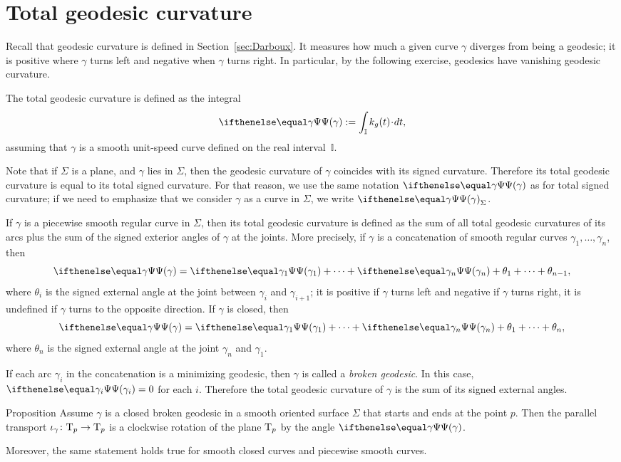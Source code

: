 \section{Total geodesic curvature}

Recall that geodesic curvature is defined in Section~\ref{sec:Darboux}.
It measures how much a given curve $\gamma$ diverges from being a geodesic;
it is positive where $\gamma$ turns left and negative when $\gamma$ turns right.
In particular, by the following exercise, geodesics have vanishing geodesic curvature.

The total geodesic curvature is defined as the integral 
\[\tgc\gamma
\df
\int_{\mathbb{I}} k_g(t)\cdot dt,\]
assuming that $\gamma$ is a smooth unit-speed curve defined on the real interval~$\mathbb{I}$.

Note that if $\Sigma$ is a plane, and $\gamma$ lies in $\Sigma$, then the geodesic curvature of $\gamma$ coincides
with its signed curvature. 
Therefore its total geodesic curvature is equal to its total signed curvature.
For that reason, we use the same notation $\tgc\gamma$ as for total signed curvature; if we need to emphasize that we consider $\gamma$ as a curve in $\Sigma$, we write $\tgc\gamma_\Sigma$.

If $\gamma$ is a piecewise smooth regular curve in $\Sigma$, then
its total geodesic curvature is defined as the sum of all total geodesic curvatures of its arcs plus the sum of the signed exterior angles of $\gamma$ at the joints.
More precisely, if $\gamma$ is a concatenation of smooth regular curves $\gamma_1,\dots,\gamma_n$, then
\[\tgc\gamma=\tgc{\gamma_1}+\dots+\tgc{\gamma_n}+\theta_1+\dots+\theta_{n-1},\]
where $\theta_i$ is the signed external angle at the joint between $\gamma_i$ and $\gamma_{i+1}$;
it is positive if $\gamma$ turns left and negative if $\gamma$ turns right, it is undefined if $\gamma$ turns to the opposite direction.
If $\gamma$ is closed, then 
\[\tgc\gamma=\tgc{\gamma_1}+\dots+\tgc{\gamma_n}+\theta_1+\dots+\theta_{n},\]
where $\theta_n$ is the signed external angle at the joint $\gamma_n$ and $\gamma_1$.

If each arc $\gamma_i$ in the concatenation is a minimizing geodesic, then $\gamma$ is called a \emph{broken geodesic}.
In this case, $\tgc{\gamma_i}=0$ for each $i$.
Therefore the total geodesic curvature of $\gamma$ is the sum of its signed external angles.

\begin{thm}{Proposition}\label{prop:pt+tgc}
Assume $\gamma$ is a closed broken geodesic in a smooth oriented surface $\Sigma$ that starts and ends at the point $p$.
Then the parallel transport $\iota_\gamma\colon\mathrm{T}_p\to\mathrm{T}_p$ is a clockwise rotation of the plane $\mathrm{T}_p$  by the angle $\tgc\gamma$.

Moreover, the same statement holds true for smooth closed curves and piecewise smooth curves.
\end{thm}

